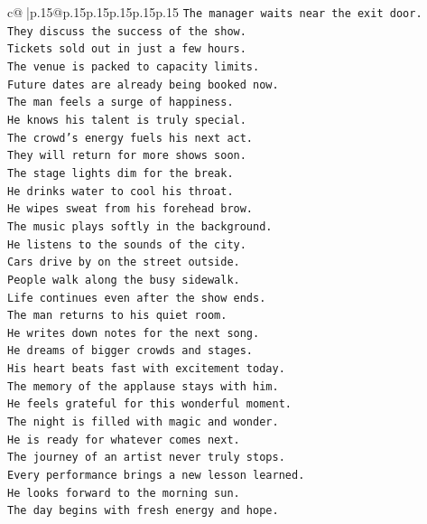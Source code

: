 \documentclass{article}
\begin{document}
{\begin{supertabular}{c@{$\;$}|p{.15\linewidth}@{}p{.15\linewidth}p{.15\linewidth}p{.15\linewidth}p{.15\linewidth}p{.15\linewidth}}
{{{\texttt{The manager waits near the exit door.} \\
\texttt{They discuss the success of the show.} \\
\texttt{Tickets sold out in just a few hours.} \\
\texttt{The venue is packed to capacity limits.} \\
\texttt{Future dates are already being booked now.} \\
\texttt{The man feels a surge of happiness.} \\
\texttt{He knows his talent is truly special.} \\
\texttt{The crowd's energy fuels his next act.} \\
\texttt{They will return for more shows soon.} \\
\texttt{The stage lights dim for the break.} \\
\texttt{He drinks water to cool his throat.} \\
\texttt{He wipes sweat from his forehead brow.} \\
\texttt{The music plays softly in the background.} \\
\texttt{He listens to the sounds of the city.} \\
\texttt{Cars drive by on the street outside.} \\
\texttt{People walk along the busy sidewalk.} \\
\texttt{Life continues even after the show ends.} \\
\texttt{The man returns to his quiet room.} \\
\texttt{He writes down notes for the next song.} \\
\texttt{He dreams of bigger crowds and stages.} \\
\texttt{His heart beats fast with excitement today.} \\
\texttt{The memory of the applause stays with him.} \\
\texttt{He feels grateful for this wonderful moment.} \\
\texttt{The night is filled with magic and wonder.} \\
\texttt{He is ready for whatever comes next.} \\
\texttt{The journey of an artist never truly stops.} \\
\texttt{Every performance brings a new lesson learned.} \\
\texttt{He looks forward to the morning sun.} \\
\texttt{The day begins with fresh energy and hope.} \\
}}}
\end{supertabular}}
\end{document}
